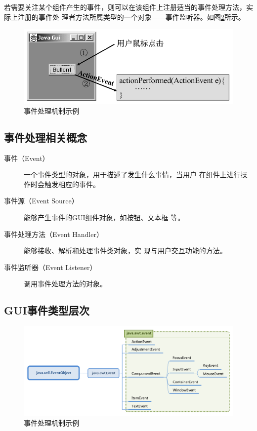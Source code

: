 若需要关注某个组件产生的事件，则可以在该组件上注册适当的事件处理方法，实际上注册的事件处
理者方法所属类型的一个对象——事件监听器。如图\ref{fig:fig-event-handle-sample}所示。

\begin{figure}[htb]
\centering
\includegraphics[width=.8\textwidth]{images/Java-GUI-programming/fig-event-handle-sample.png}
\caption{事件处理机制示例}
\label{fig:fig-event-handle-sample}
\end{figure}

\subsection{事件处理相关概念}

\begin{description}
\item[事件（Event）] 一个事件类型的对象，用于描述了发生什么事情，当用户
  在组件上进行操作时会触发相应的事件。
\item[事件源（Event Source）] 能够产生事件的GUI组件对象，如按钮、文本框
  等。
\item[事件处理方法（Event Handler）] 能够接收、解析和处理事件类对象，实
  现与用户交互功能的方法。
\item[事件监听器（Event Listener）] 调用事件处理方法的对象。
\end{description}


\subsection{GUI事件类型层次}

\begin{figure}[htb]
\centering
\includegraphics[width=.8\textwidth]{images/Java-GUI-programming/fig-awt-events.pdf}
\caption{事件处理机制示例}
\label{fig:fig-event-handle-sample}
\end{figure}

